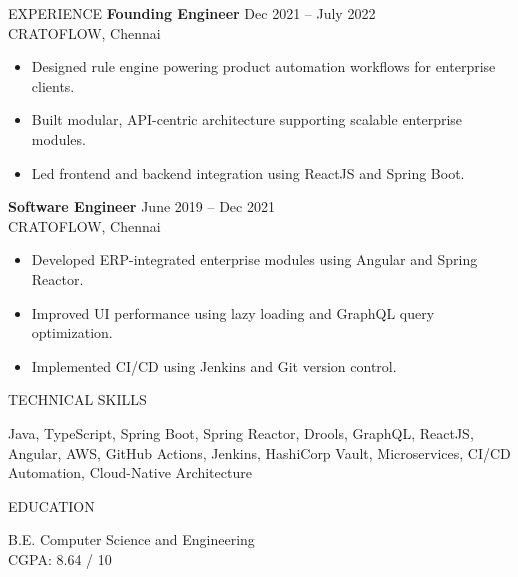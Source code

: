 \documentclass{resume}
\begin{document}
\begin{rSection}{EXPERIENCE}
\textbf{Founding Engineer} \hfill Dec 2021 – July 2022 \\
CRATOFLOW, Chennai
\begin{itemize}
\itemsep -3pt {}
\item Designed rule engine powering product automation workflows for enterprise clients.
\item Built modular, API-centric architecture supporting scalable enterprise modules.
\item Led frontend and backend integration using ReactJS and Spring Boot.
\end{itemize}

\textbf{Software Engineer} \hfill June 2019 – Dec 2021 \\
CRATOFLOW, Chennai
\begin{itemize}
\itemsep -3pt {}
\item Developed ERP-integrated enterprise modules using Angular and Spring Reactor.
\item Improved UI performance using lazy loading and GraphQL query optimization.
\item Implemented CI/CD using Jenkins and Git version control.
\end{itemize}

\end{rSection}

\begin{rSection}{TECHNICAL SKILLS}

Java, TypeScript, Spring Boot, Spring Reactor, Drools, GraphQL, ReactJS, Angular, AWS, GitHub Actions, Jenkins, HashiCorp Vault, Microservices, CI/CD Automation, Cloud-Native Architecture

\end{rSection}

\begin{rSection}{EDUCATION}

B.E. Computer Science and Engineering \\
CGPA: 8.64 / 10

\end{rSection}
\end{document}
